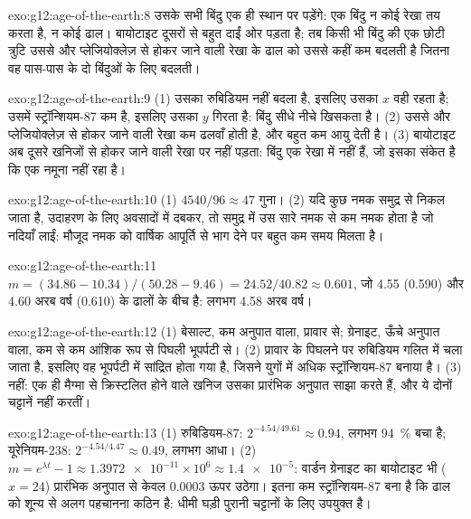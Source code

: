 \begin{solution}{exo:g12:age-of-the-earth:8}
उसके सभी बिंदु एक ही स्थान पर पड़ेंगे: एक बिंदु न कोई रेखा तय करता है, न
कोई ढाल। बायोटाइट दूसरों से बहुत दाईं ओर पड़ता है; तब किसी भी बिंदु की एक छोटी
त्रुटि उससे और प्लेजियोक्लेज़ से होकर जाने वाली रेखा के ढाल को उससे कहीं कम बदलती है
जितना वह पास-पास के दो बिंदुओं के लिए बदलती।
\end{solution}

\begin{solution}{exo:g12:age-of-the-earth:9}
(1) उसका रुबिडियम नहीं बदला है, इसलिए उसका $x$ वही रहता है; उसमें
स्ट्रॉन्शियम-87 कम है, इसलिए उसका $y$ गिरता है: बिंदु सीधे नीचे खिसकता है। (2) उससे और
प्लेजियोक्लेज़ से होकर जाने वाली रेखा कम ढलवाँ होती है, और बहुत कम आयु देती है।
(3) बायोटाइट अब दूसरे खनिजों से होकर जाने वाली रेखा पर नहीं पड़ता: बिंदु
एक रेखा में नहीं हैं, जो इसका संकेत है कि एक नमूना  नहीं रहा है।
\end{solution}

\begin{solution}{exo:g12:age-of-the-earth:10}
(1) $4540/96 \approx 47$ गुना। (2) यदि कुछ नमक समुद्र से निकल जाता है, उदाहरण के लिए
अवसादों में दबकर, तो समुद्र में उस सारे नमक से कम नमक होता है जो नदियाँ लाईं:
मौजूद नमक को वार्षिक आपूर्ति से भाग देने पर बहुत कम
समय मिलता है।
\end{solution}

\begin{solution}{exo:g12:age-of-the-earth:11}
$m = (34.86 - 10.34)/(50.28 - 9.46) = 24.52/40.82 \approx 0.601$, जो
4.55 (0.590) और 4.60 अरब वर्ष (0.610) के ढालों के बीच है: लगभग 4.58
अरब वर्ष।
\end{solution}

\begin{solution}{exo:g12:age-of-the-earth:12}
(1) बेसाल्ट, कम अनुपात वाला, प्रावार से; ग्रेनाइट, ऊँचे अनुपात
वाला, कम से कम आंशिक रूप से पिघली भूपर्पटी से। (2) प्रावार के पिघलने पर रुबिडियम
गलित में चला जाता है, इसलिए वह भूपर्पटी में सांद्रित होता गया है, जिसने
युगों में अधिक स्ट्रॉन्शियम-87 बनाया है। (3) नहीं: एक ही मैग्मा से क्रिस्टलित होने वाले
खनिज उसका प्रारंभिक अनुपात साझा करते हैं, और ये दोनों चट्टानें नहीं करतीं।
\end{solution}

\begin{solution}{exo:g12:age-of-the-earth:13}
(1) रुबिडियम-87: $2^{-4.54/49.61} \approx 0.94$, लगभग \qty{94}{\percent}
बचा है; यूरेनियम-238: $2^{-4.54/4.47} \approx 0.49$, लगभग आधा। (2) $m =
e^{\lambda t} - 1 \approx \num{1.3972e-11} \times 10^6 \approx
\num{1.4e-5}$: वार्डन ग्रेनाइट का बायोटाइट भी ($x = 24$) प्रारंभिक अनुपात से
केवल $0.0003$ ऊपर उठेगा। इतना कम स्ट्रॉन्शियम-87 बना है कि ढाल
को शून्य से अलग पहचानना कठिन है: धीमी घड़ी पुरानी चट्टानों के लिए उपयुक्त है।
\end{solution}

